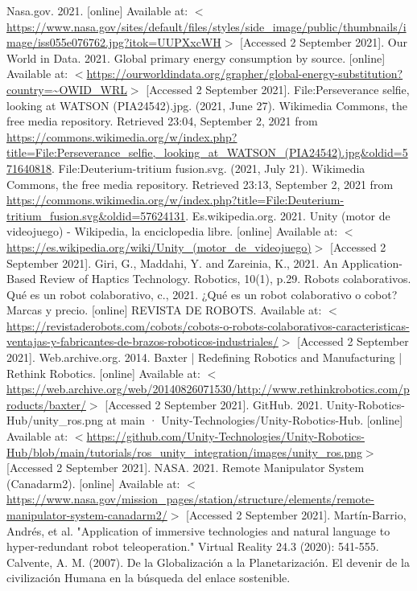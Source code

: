 \begin{thebibliography}{2}
	 Nasa.gov. 2021. [online] Available at: $<$\url{https://www.nasa.gov/sites/default/files/styles/side\_image/public/thumbnails/image/iss055e076762.jpg?itok=UUPXxcWH}$>$ [Accessed 2 September 2021].
	 Our World in Data. 2021. Global primary energy consumption by source. [online] Available at: $<$\url{https://ourworldindata.org/grapher/global-energy-substitution?country=~OWID\_WRL}$>$ [Accessed 2 September 2021].
	 File:Perseverance selfie, looking at WATSON (PIA24542).jpg. (2021, June 27). Wikimedia Commons, the free media repository. Retrieved 23:04, September 2, 2021 from \url{https://commons.wikimedia.org/w/index.php?title=File:Perseverance\_selfie,\_looking\_at\_WATSON\_(PIA24542).jpg\&oldid=571640818}.
	 File:Deuterium-tritium fusion.svg. (2021, July 21). Wikimedia Commons, the free media repository. Retrieved 23:13, September 2, 2021 from \url{https://commons.wikimedia.org/w/index.php?title=File:Deuterium-tritium\_fusion.svg\&oldid=57624131}.
	 Es.wikipedia.org. 2021. Unity (motor de videojuego) - Wikipedia, la enciclopedia libre. [online] Available at: $<$\url{https://es.wikipedia.org/wiki/Unity\_(motor\_de\_videojuego)}$>$ [Accessed 2 September 2021].
	 Giri, G., Maddahi, Y. and Zareinia, K., 2021. An Application-Based Review of Haptics Technology. Robotics, 10(1), p.29.
	 Robots colaborativos. Qué es un robot colaborativo, c., 2021.  ¿Qué es un robot colaborativo o cobot? Marcas y precio. [online] REVISTA DE ROBOTS. Available at: $<$\href{https://revistaderobots.com/cobots/cobots-o-robots-colaborativos-caracteristicas-ventajas-y-fabricantes-de-brazos-roboticos-industriales/}{https://revistaderobots.com/cobots/cobots-o-robots-colaborativos-caracteristicas-ventajas-y-fabricantes-de-brazos-roboticos-industriales/}$>$ [Accessed 2 September 2021].
	 Web.archive.org. 2014. Baxter | Redefining Robotics and Manufacturing | Rethink Robotics. [online] Available at: $<$\url{https://web.archive.org/web/20140826071530/http://www.rethinkrobotics.com/products/baxter/}$>$ [Accessed 2 September 2021].
	 GitHub. 2021. Unity-Robotics-Hub/unity\_ros.png at main · Unity-Technologies/Unity-Robotics-Hub. [online] Available at: $<$\url{https://github.com/Unity-Technologies/Unity-Robotics-Hub/blob/main/tutorials/ros\_unity\_integration/images/unity\_ros.png}$>$ [Accessed 2 September 2021].
	 NASA. 2021. Remote Manipulator System (Canadarm2). [online] Available at: $<$\url{https://www.nasa.gov/mission\_pages/station/structure/elements/remote-manipulator-system-canadarm2/}$>$ [Accessed 2 September 2021].
	 Martín-Barrio, Andrés, et al. "Application of immersive technologies and natural language to hyper-redundant robot teleoperation." Virtual Reality 24.3 (2020): 541-555.
	 Calvente, A. M. (2007). De la Globalización a la Planetarización. El devenir de la civilización Humana en la búsqueda del enlace sostenible.

\end{thebibliography}